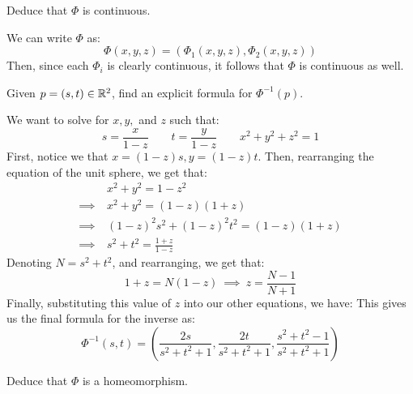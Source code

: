 \begin{qu}[num=23.2]
    Deduce that $ \Phi $ is continuous.
\end{qu}

\begin{soln}
    We can write $ \Phi $ as:
    \begin{equation*}
        \Phi(x, y, z) = (\Phi_{1}(x,y,z), \Phi_{2}(x,y,z))
    \end{equation*}
    Then, since each $ \Phi_{i} $ is clearly continuous, it follows that
    $ \Phi $ is continuous as well.
\end{soln}

\begin{qu}[num=23.3]
    Given $ p = (s, t) \in \mathbb{R}^{2} $, find an explicit formula for
    $ \Phi^{-1}(p) $.
\end{qu}

\begin{soln}
    We want to solve for $ x, y, $ and $ z $ such that:
    \begin{equation*}
        s = \frac{x}{1-z} \qquad t = \frac{y}{1-z} \qquad x^{2}+y^{2}+z^{2}=1
    \end{equation*}
    First, notice we that $ x = (1-z)s, y = (1-z)t $.
    Then, rearranging the equation of the unit sphere, we get that:
    \begin{align*}
        & x^{2} + y^{2} = 1 - z^{2} \\
        \implies \ & x^{2} + y^{2} = (1-z)(1+z) \\
        \implies \ & (1-z)^{2}s^{2} + (1-z)^{2}t^{2} = (1-z)(1+z) \\
        \implies \ & s^{2} + t^{2} = \frac{1+z}{1-z}
    \end{align*}
    Denoting $ N = s^{2} + t^{2} $, and rearranging, we get that:
    \begin{equation*}
        1 + z = N(1 - z) \ \implies \ z = \frac{N - 1}{N + 1}
    \end{equation*}
    Finally, substituting this value of $ z $ into our other equations, we have:
    This gives us the final formula for the inverse as:
    \begin{equation*}
        \Phi^{-1}(s, t) = \left( \frac{2s}{s^{2} + t^{2} + 1},
        \frac{2t}{s^{2}+t^{2}+1},\frac{s^{2}+t^{2}-1}{s^{2}+t^{2}+1}
        \right)
    \end{equation*}
\end{soln}

\newpage
\begin{qu}[num=23.4]
    Deduce that $ \Phi $ is a homeomorphism.
\end{qu}

